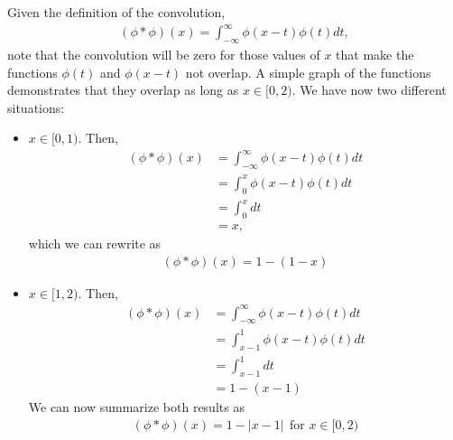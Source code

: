 \begin{questions}

\begin{solution}
Given the definition of the convolution,
\begin{align*}
\left(\phi*\phi\right)(x)=\int_{-\infty}^{\infty}\phi(x-t)\phi(t)dt,
\end{align*}
note that the convolution will be zero for those values of $x$ that make the functions $\phi(t)$ and $\phi(x-t)$ not overlap. A simple graph of the functions demonstrates that they overlap as long as $x\in[0,2)$. We have now two different situations:
\begin{itemize}
\item $x\in[0,1)$. Then,
\begin{align*}
\left(\phi*\phi\right)(x)&=\int_{-\infty}^{\infty}\phi(x-t)\phi(t)dt\\
&=\int_{0}^{x}\phi(x-t)\phi(t)dt\\
&=\int_{0}^{x}dt\\
&=x,
\end{align*}
which we can rewrite as
\begin{align*}
\left(\phi*\phi\right)(x)=1-(1-x)
\end{align*}
\item $x\in[1,2)$. Then,
\begin{align*}
\left(\phi*\phi\right)(x)&=\int_{-\infty}^{\infty}\phi(x-t)\phi(t)dt\\
&=\int_{x-1}^{1}\phi(x-t)\phi(t)dt\\
&=\int_{x-1}^{1}dt\\
&=1-(x-1)
\end{align*}
We can now summarize both results as
\begin{align*}
\left(\phi*\phi\right)(x)=1-|x-1|~~\text{for }x\in[0,2)
\end{align*}
\end{itemize}
\end{solution}
\end{questions}
